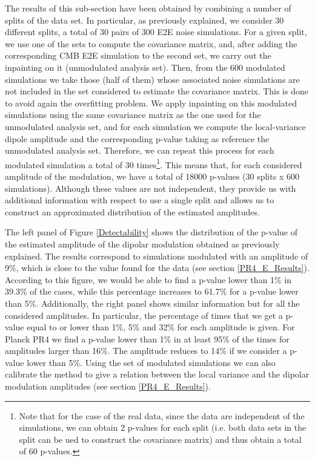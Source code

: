 The results of this sub-section have been obtained by combining a number of splits of the data set. In particular, as previously explained, we consider 30 different splits, a total of 30 pairs of 300 E2E noise simulations. For a given split, we use one of the sets to compute the covariance matrix, and, after adding the corresponding CMB E2E simulation to the second set, we carry out the inpainting on it (unmodulated analysis set). Then, from the 600 modulated simulations we take those (half of them) whose associated noise simulations are not included in the set considered to estimate the covariance matrix. This is done to avoid again the overfitting problem. We apply inpainting on this modulated simulations using the same covariance matrix as the one used for the unmodulated analysis set, and for each simulation we compute the local-variance dipole amplitude and the corresponding p-value taking as reference the unmodulated analysis set. 
Therefore, we can repeat this process for each modulated simulation a total of 30 times\footnote{Note that for the case of the real data, since the data are independent of the simulations, we can obtain 2 p-values for each split (i.e. both data sets in the split can be ued to construct the covariance matrix) and thus obtain a total of 60 p-values.}. This means that, for each considered amplitude of the modulation, we have a total of 18000 p-values (30 splits x 600 simulations). Although these values are not independent, they provide us with additional information with respect to use a single split and allows us to construct an approximated distribution of the estimated amplitudes. 

The left panel of Figure \ref{Detectability} shows the distribution of the p-value of the estimated amplitude of the dipolar modulation obtained as previously explained. The results correspond to simulations modulated with an amplitude of 9\%, which is close to the value found for the data (see section \ref{PR4_E_Results}). According to this figure, we would be able to find a p-value lower than 1\% in 39.3\% of the cases, while this percentage increases to 61.7\% for a p-value lower than 5\%. Additionally, the right panel shows similar information but for all the considered amplitudes. In particular, the percentage of times that we get
a p-value equal to or lower than 1\%, 5\% and 32\% for each amplitude is given. For Planck PR4 we find a p-value lower than 1\% in at least 95\% of the times for amplitudes larger than 16\%. The amplitude reduces to 14\% if we consider a p-value lower than 5\%. 
Using the set of modulated simulations we can also calibrate the method to give a relation between the local variance and the dipolar modulation amplitudes (see section \ref{PR4_E_Results}).

